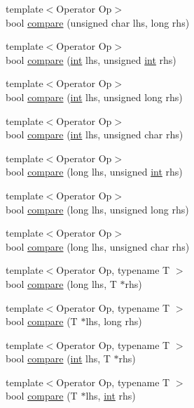 \begin{DoxyCompactItemize}
\item 
{\footnotesize template$<$Operator Op$>$ }\\bool \hyperlink{namespace_catch_1_1_internal_a640e0cce9260a912842bee58db501dc5}{compare} (unsigned char lhs, long rhs)
\item 
{\footnotesize template$<$Operator Op$>$ }\\bool \hyperlink{namespace_catch_1_1_internal_a17c92ed4b6d88a9f8bbcbc52544fe40f}{compare} (\hyperlink{_s_d_l__thread_8h_a6a64f9be4433e4de6e2f2f548cf3c08e}{int} lhs, unsigned \hyperlink{_s_d_l__thread_8h_a6a64f9be4433e4de6e2f2f548cf3c08e}{int} rhs)
\item 
{\footnotesize template$<$Operator Op$>$ }\\bool \hyperlink{namespace_catch_1_1_internal_aac7a6452ed0d324031ceb7b4f3a3b61c}{compare} (\hyperlink{_s_d_l__thread_8h_a6a64f9be4433e4de6e2f2f548cf3c08e}{int} lhs, unsigned long rhs)
\item 
{\footnotesize template$<$Operator Op$>$ }\\bool \hyperlink{namespace_catch_1_1_internal_a7e82d987f62b9822107027c72a55fa6b}{compare} (\hyperlink{_s_d_l__thread_8h_a6a64f9be4433e4de6e2f2f548cf3c08e}{int} lhs, unsigned char rhs)
\item 
{\footnotesize template$<$Operator Op$>$ }\\bool \hyperlink{namespace_catch_1_1_internal_a0b4783ede1901e5c1baf8ff909bcce8d}{compare} (long lhs, unsigned \hyperlink{_s_d_l__thread_8h_a6a64f9be4433e4de6e2f2f548cf3c08e}{int} rhs)
\item 
{\footnotesize template$<$Operator Op$>$ }\\bool \hyperlink{namespace_catch_1_1_internal_ae9aec44a08d9cbb0d3dd46d438b50d2c}{compare} (long lhs, unsigned long rhs)
\item 
{\footnotesize template$<$Operator Op$>$ }\\bool \hyperlink{namespace_catch_1_1_internal_a79664b5f5f497fba57bd156e098de1f2}{compare} (long lhs, unsigned char rhs)
\item 
{\footnotesize template$<$Operator Op, typename T $>$ }\\bool \hyperlink{namespace_catch_1_1_internal_a829570ad9e724c687aa42190a696032b}{compare} (long lhs, T $\ast$rhs)
\item 
{\footnotesize template$<$Operator Op, typename T $>$ }\\bool \hyperlink{namespace_catch_1_1_internal_a3f89c65fdb06aa7b648c5acf0ca107a9}{compare} (T $\ast$lhs, long rhs)
\item 
{\footnotesize template$<$Operator Op, typename T $>$ }\\bool \hyperlink{namespace_catch_1_1_internal_a4f30c29e4adb62c7e209e5b988e59397}{compare} (\hyperlink{_s_d_l__thread_8h_a6a64f9be4433e4de6e2f2f548cf3c08e}{int} lhs, T $\ast$rhs)
\item 
{\footnotesize template$<$Operator Op, typename T $>$ }\\bool \hyperlink{namespace_catch_1_1_internal_a95361ddae55c9a390e6510bdadccb1fc}{compare} (T $\ast$lhs, \hyperlink{_s_d_l__thread_8h_a6a64f9be4433e4de6e2f2f548cf3c08e}{int} rhs)
\end{DoxyCompactItemize}


